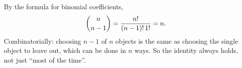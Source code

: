 By the formula for binomial coefficients,
\[
\dbinom{n}{n-1}=\dfrac{n!}{(n-1)!\,1!}=n .
\]
Combinatorially: choosing $n-1$ of $n$ objects is the same as choosing the single object to leave out, which can be done in $n$ ways. So the identity always holds, not just ``most of the time''.
